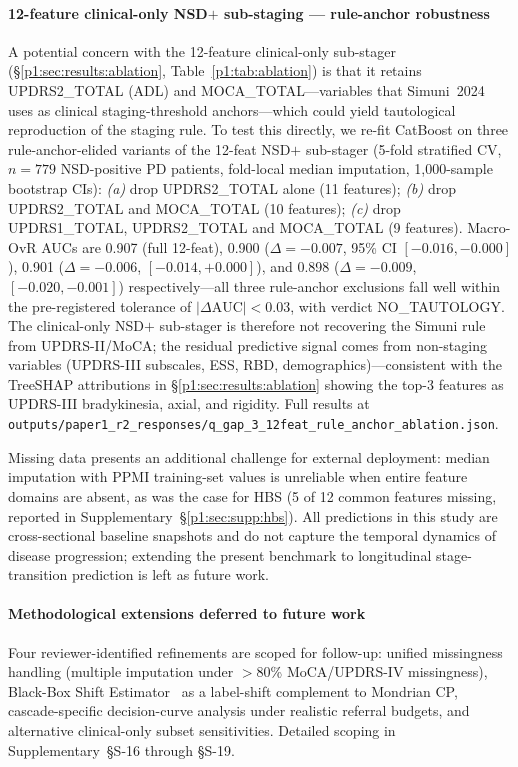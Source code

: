 \paragraph*{12-feature clinical-only NSD$+$ sub-staging --- rule-anchor robustness} A potential concern with the 12-feature clinical-only sub-stager (\S\ref{p1:sec:results:ablation}, Table~\ref{p1:tab:ablation}) is that it retains UPDRS2\_TOTAL (ADL) and MOCA\_TOTAL---variables that Simuni~2024 uses as clinical staging-threshold anchors---which could yield tautological reproduction of the staging rule. To test this directly, we re-fit CatBoost on three rule-anchor-elided variants of the 12-feat NSD$+$ sub-stager (5-fold stratified CV, $n{=}779$ NSD-positive PD patients, fold-local median imputation, 1{,}000-sample bootstrap CIs): \emph{(a)} drop UPDRS2\_TOTAL alone (11 features); \emph{(b)} drop UPDRS2\_TOTAL and MOCA\_TOTAL (10 features); \emph{(c)} drop UPDRS1\_TOTAL, UPDRS2\_TOTAL and MOCA\_TOTAL (9 features). Macro-OvR AUCs are 0.907 (full 12-feat), 0.900 ($\Delta{=}{-}0.007$, 95\% CI $[{-}0.016, {-}0.000]$), 0.901 ($\Delta{=}{-}0.006$, $[{-}0.014, {+}0.000]$), and 0.898 ($\Delta{=}{-}0.009$, $[{-}0.020, {-}0.001]$) respectively---all three rule-anchor exclusions fall well within the pre-registered tolerance of $|\Delta\mathrm{AUC}|<0.03$, with verdict NO\_TAUTOLOGY. The clinical-only NSD$+$ sub-stager is therefore not recovering the Simuni rule from UPDRS-II/MoCA; the residual predictive signal comes from non-staging variables (UPDRS-III subscales, ESS, RBD, demographics)---consistent with the TreeSHAP attributions in \S\ref{p1:sec:results:ablation} showing the top-3 features as UPDRS-III bradykinesia, axial, and rigidity. Full results at \texttt{outputs/paper1\_r2\_responses/q\_gap\_3\_12feat\_rule\_anchor\_ablation.json}.

Missing data presents an additional challenge for external deployment: median imputation with PPMI training-set values is unreliable when entire feature domains are absent, as was the case for HBS (5 of 12 common features missing, reported in Supplementary~\S\ref{p1:sec:supp:hbs}). All predictions in this study are cross-sectional baseline snapshots and do not capture the temporal dynamics of disease progression; extending the present benchmark to longitudinal stage-transition prediction is left as future work.

\paragraph*{Methodological extensions deferred to future work} Four reviewer-identified refinements are scoped for follow-up: unified missingness handling (multiple imputation under $>$80\% MoCA/UPDRS-IV missingness), Black-Box Shift Estimator~\cite{lipton2018bbse} as a label-shift complement to Mondrian CP, cascade-specific decision-curve analysis under realistic referral budgets, and alternative clinical-only subset sensitivities. Detailed scoping in Supplementary~\S{}S-16 through \S{}S-19.

